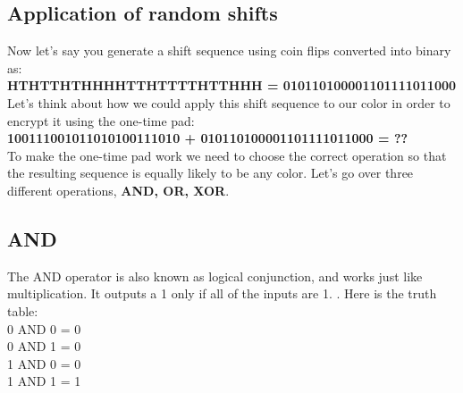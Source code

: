 \documentclass{report}
\begin{document}
\subsection{Application of random shifts}

Now let’s say you generate a shift sequence using coin flips converted into binary as:\\
\textbf{HTHTTHTHHHHTTHTTTTHTTHHH = 010110100001101111011000}\\
Let’s think about how we could apply this shift sequence to our color in order to encrypt it using the one-time pad:\\
\textbf{100111001011010100111010 + 010110100001101111011000 = ??}\\
To make the one-time pad work we need to choose the correct operation so that the resulting sequence is equally likely to be any color. Let’s go over three different operations, \textbf{AND, OR, XOR}.

\subsection{AND}

The AND operator is also known as logical conjunction, and works just like multiplication. 
It outputs a 1 only if all of the inputs are 1. . Here is the truth table:\\
0 AND 0 = 0\\
0 AND 1 = 0\\
1 AND 0 = 0\\
1 AND 1 = 1\\
\end{document}
